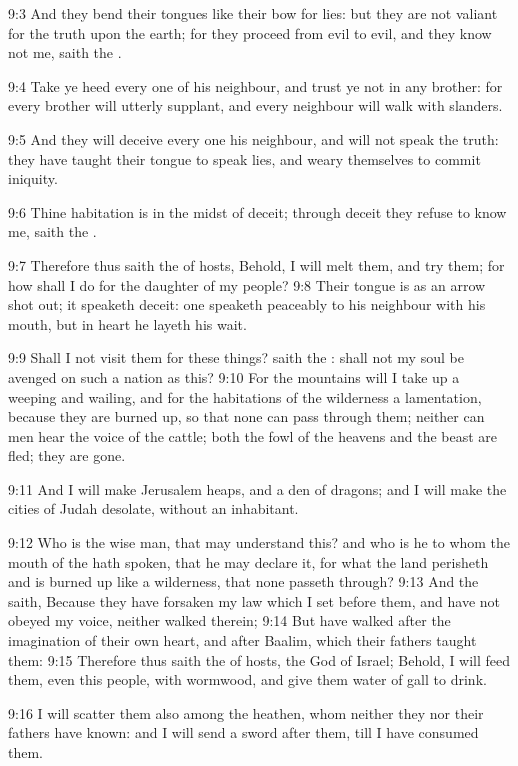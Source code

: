 9:3 And they bend their tongues like their bow for lies: but they are
not valiant for the truth upon the earth; for they proceed from evil
to evil, and they know not me, saith the \LORD.

9:4 Take ye heed every one of his neighbour, and trust ye not in any
brother: for every brother will utterly supplant, and every neighbour
will walk with slanders.

9:5 And they will deceive every one his neighbour, and will not speak
the truth: they have taught their tongue to speak lies, and weary
themselves to commit iniquity.

9:6 Thine habitation is in the midst of deceit; through deceit they
refuse to know me, saith the \LORD.

9:7 Therefore thus saith the \LORD of hosts, Behold, I will melt them,
and try them; for how shall I do for the daughter of my people?  9:8
Their tongue is as an arrow shot out; it speaketh deceit: one speaketh
peaceably to his neighbour with his mouth, but in heart he layeth his
wait.

9:9 Shall I not visit them for these things? saith the \LORD: shall not
my soul be avenged on such a nation as this?  9:10 For the mountains
will I take up a weeping and wailing, and for the habitations of the
wilderness a lamentation, because they are burned up, so that none can
pass through them; neither can men hear the voice of the cattle; both
the fowl of the heavens and the beast are fled; they are gone.

9:11 And I will make Jerusalem heaps, and a den of dragons; and I will
make the cities of Judah desolate, without an inhabitant.

9:12 Who is the wise man, that may understand this? and who is he to
whom the mouth of the \LORD hath spoken, that he may declare it, for
what the land perisheth and is burned up like a wilderness, that none
passeth through?  9:13 And the \LORD saith, Because they have forsaken
my law which I set before them, and have not obeyed my voice, neither
walked therein; 9:14 But have walked after the imagination of their
own heart, and after Baalim, which their fathers taught them: 9:15
Therefore thus saith the \LORD of hosts, the God of Israel; Behold, I
will feed them, even this people, with wormwood, and give them water
of gall to drink.

9:16 I will scatter them also among the heathen, whom neither they nor
their fathers have known: and I will send a sword after them, till I
have consumed them.

